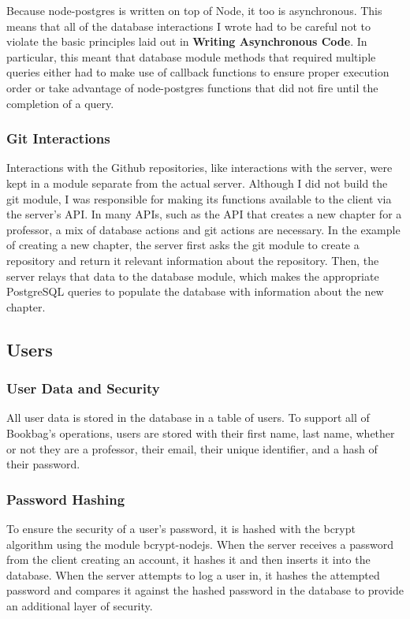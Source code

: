 \documentclass[pageno]{jpaper}
\begin{document}
Because node-postgres is written on top of Node, it too is asynchronous. This means that all of the database interactions I wrote had to be careful not to violate the basic principles laid out in \textbf{Writing Asynchronous Code}. In particular, this meant that database module methods that required multiple queries either had to make use of callback functions to ensure proper execution order or take advantage of node-postgres functions that did not fire until the completion of a query.

\subsubsection{Git Interactions}

Interactions with the Github repositories, like interactions with the server, were kept in a module separate from the actual server. Although I did not build the git module, I was responsible for making its functions available to the client via the server's API. In many APIs, such as the API that creates a new chapter for a professor, a mix of database actions and git actions are necessary. In the example of creating a new chapter, the server first asks the git module to create a repository and return it relevant information about the repository. Then, the server relays that data to the database module, which makes the appropriate PostgreSQL queries to populate the database with information about the new chapter.

\subsection{Users}

\subsubsection{User Data and Security}

All user data is stored in the database in a table of users. To support all of Bookbag's operations, users are stored with their first name, last name, whether or not they are a professor, their email, their unique identifier, and a hash of their password.

\subsubsection{Password Hashing}

To ensure the security of a user's password, it is hashed with the bcrypt algorithm using the module bcrypt-nodejs. When the server receives a password from the client creating an account, it hashes it and then inserts it into the database. When the server attempts to log a user in, it hashes the attempted password and compares it against the hashed password in the database to provide an additional layer of security.
\end{document}
